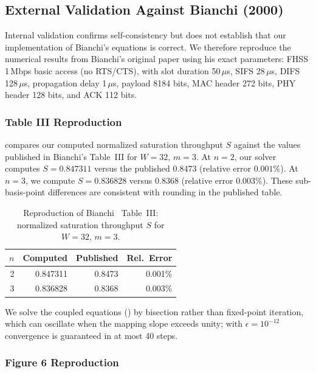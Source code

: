 \documentclass[conference]{IEEEtran}
\begin{document}
\subsection{External Validation Against Bianchi (2000)}
\label{sec:external_val}

Internal validation confirms self-consistency but does not establish
that our implementation of Bianchi's equations is correct.  We therefore
reproduce the numerical results from Bianchi's original paper
\cite{bianchi2000} using his exact parameters: FHSS 1\,Mbps basic
access (no RTS/CTS), with slot duration 50\,$\mu$s, SIFS 28\,$\mu$s,
DIFS 128\,$\mu$s, propagation delay 1\,$\mu$s, payload 8184 bits,
MAC header 272 bits, PHY header 128 bits, and ACK 112 bits.

\subsubsection{Table III Reproduction}

 compares our computed normalized saturation
throughput $S$ against the values published in Bianchi's Table~III for
$W{=}32$, $m{=}3$.  At $n{=}2$, our solver computes $S = 0.847311$
versus the published $0.8473$ (relative error $0.001\%$).  At $n{=}3$,
we compute $S = 0.836828$ versus $0.8368$ (relative error $0.003\%$).
These sub-basis-point differences are consistent with rounding in the
published table.

\begin{table}[t]
\centering
\caption{Reproduction of Bianchi~\cite{bianchi2000} Table~III:
normalized saturation throughput $S$ for $W{=}32$, $m{=}3$.}
\label{tab:bianchi_table3}
\begin{tabular}{@{}rrrr@{}}
\toprule
$n$ & \textbf{Computed} & \textbf{Published} & \textbf{Rel.\ Error} \\
\midrule
2  & 0.847311 & 0.8473 & 0.001\% \\
3  & 0.836828 & 0.8368 & 0.003\% \\
\bottomrule
\end{tabular}
\end{table}

We solve the coupled equations () by bisection rather
than fixed-point iteration, which can oscillate when the mapping slope
exceeds unity; with $\epsilon = 10^{-12}$ convergence is guaranteed in
at most 40 steps.

\subsubsection{Figure 6 Reproduction}
\end{document}
